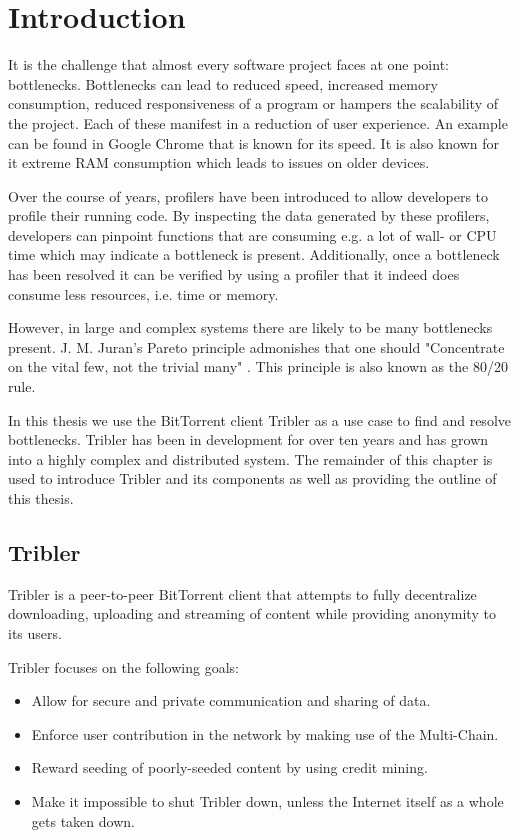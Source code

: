 \chapter{Introduction}
\label{chp:introduction}

It is the challenge that almost every software project faces at one point: bottlenecks.
Bottlenecks can lead to reduced speed, increased memory consumption, reduced responsiveness of a program or hampers the scalability of the project.
Each of these manifest in a reduction of user experience.
An example can be found in Google Chrome that is known for its speed.
It is also known for it extreme RAM consumption which leads to issues on older devices.

Over the course of years, profilers have been introduced to allow developers to profile their running code.
By inspecting the data generated by these profilers, developers can pinpoint functions that are consuming e.g. a lot of wall- or CPU time which may indicate a bottleneck is present.
Additionally, once a bottleneck has been resolved it can be verified by using a profiler that it indeed does consume less resources, i.e. time or memory.

However, in large and complex systems there are likely to be many bottlenecks present.
J. M. Juran's Pareto principle admonishes that one should "Concentrate on the vital few, not the trivial many" . This principle is also known as the 80/20 rule. 

In this thesis we use the BitTorrent client Tribler as a use case to find and resolve bottlenecks.
Tribler has been in development for over ten years and has grown into a highly complex and distributed system.
The remainder of this chapter is used to introduce Tribler and its components as well as providing the outline of this thesis.

\section{Tribler}
Tribler is a peer-to-peer BitTorrent client that attempts to fully decentralize downloading, uploading and streaming of content while providing anonymity to its users.

Tribler focuses on the following goals:
\begin{itemize}
    \item Allow for secure and private communication and sharing of data.
    \item Enforce user contribution in the network by making use of the Multi-Chain.
    \item Reward seeding of poorly-seeded content by using credit mining.
    \item Make it impossible to shut Tribler down, unless the Internet itself as a whole gets taken down.
\end{itemize}

